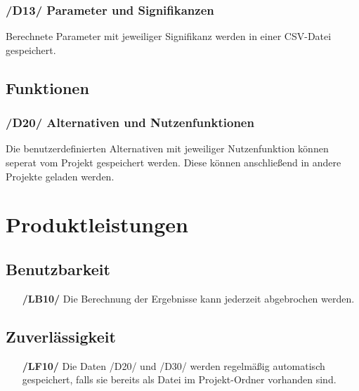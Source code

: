 \documentclass{article}
\begin{document}
\subsubsection*{/D13/ Parameter und Signifikanzen}
Berechnete Parameter mit jeweiliger Signifikanz werden in einer CSV-Datei gespeichert.
\subsection{Funktionen}
\subsubsection*{/D20/ Alternativen und Nutzenfunktionen}
Die benutzerdefinierten Alternativen mit jeweiliger Nutzenfunktion können seperat vom Projekt gespeichert werden. Diese können anschließend in andere Projekte geladen werden.


\clearpage
\section{Produktleistungen}
\subsection{Benutzbarkeit}
\begin{itemize}
    \item[\textbf{/LB10/}] Die Berechnung der Ergebnisse kann jederzeit abgebrochen werden.
\end{itemize}
\subsection{Zuverlässigkeit}
\begin{itemize}
    \item[\textbf{/LF10/}] Die Daten /D20/ und /D30/ werden regelmäßig automatisch gespeichert, falls sie bereits als Datei im Projekt-Ordner vorhanden sind.
\end{itemize}
\end{document}
